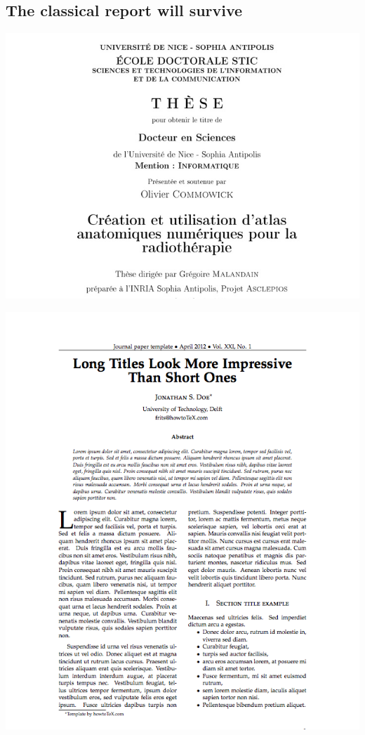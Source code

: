 \documentclass[%
oneside,                 %
final,                   %
10pt]{article}
\begin{document}
\subsection{The classical report will survive}
\vspace{6mm}
\centerline{\includegraphics[width=1.2\linewidth]{testfigs/latex_thesis.jpg}}
\vspace{6mm}
\vspace{6mm}
\centerline{\includegraphics[width=1.2\linewidth]{testfigs/latex_paper1.png}}
\vspace{6mm}
\end{document}
